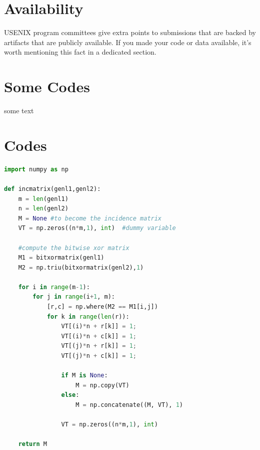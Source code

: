 \documentclass[a4paper,10pt,titlepage]{ctexart}
\begin{document}
\section*{Availability}

USENIX program committees give extra points to submissions that are
backed by artifacts that are publicly available. If you made your code
or data available, it's worth mentioning this fact in a dedicated
section.




\begin{appendices}
\section{Some Codes}
some text
\section{Codes}

\begin{lstlisting}[language=Python]
import numpy as np

def incmatrix(genl1,genl2):
    m = len(genl1)
    n = len(genl2)
    M = None #to become the incidence matrix
    VT = np.zeros((n*m,1), int)  #dummy variable

    #compute the bitwise xor matrix
    M1 = bitxormatrix(genl1)
    M2 = np.triu(bitxormatrix(genl2),1)

    for i in range(m-1):
        for j in range(i+1, m):
            [r,c] = np.where(M2 == M1[i,j])
            for k in range(len(r)):
                VT[(i)*n + r[k]] = 1;
                VT[(i)*n + c[k]] = 1;
                VT[(j)*n + r[k]] = 1;
                VT[(j)*n + c[k]] = 1;

                if M is None:
                    M = np.copy(VT)
                else:
                    M = np.concatenate((M, VT), 1)

                VT = np.zeros((n*m,1), int)

    return M
\end{lstlisting}
\end{appendices}

\end{document}
